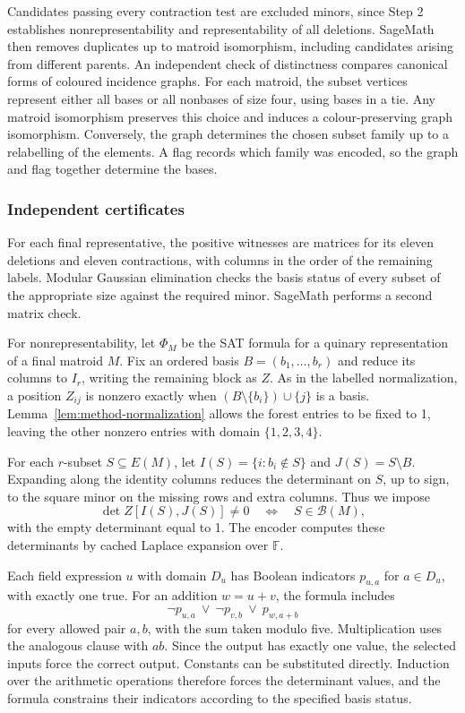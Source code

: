 \documentclass[11pt,letterpaper,titlepage]{article}
\def\F{\mathbb{F}}
\def\B{\mathcal{B}}
\begin{document}
Candidates passing every contraction test are excluded minors, since Step 2 establishes nonrepresentability and representability of all deletions. SageMath then removes duplicates up to matroid isomorphism, including candidates arising from different parents. An independent check of distinctness compares canonical forms of coloured incidence graphs. For each matroid, the subset vertices represent either all bases or all nonbases of size four, using bases in a tie. Any matroid isomorphism preserves this choice and induces a colour-preserving graph isomorphism. Conversely, the graph determines the chosen subset family up to a relabelling of the elements. A flag records which family was encoded, so the graph and flag together determine the bases.

\subsubsection{Independent certificates}

For each final representative, the positive witnesses are matrices for its eleven deletions and eleven contractions, with columns in the order of the remaining labels. Modular Gaussian elimination checks the basis status of every subset of the appropriate size against the required minor. SageMath performs a second matrix check.

For nonrepresentability, let \(\Phi_M\) be the SAT formula for a quinary representation of a final matroid \(M\). Fix an ordered basis \(B=(b_1,\ldots,b_r)\) and reduce its columns to \(I_r\), writing the remaining block as \(Z\). As in the labelled normalization, a position \(Z_{ij}\) is nonzero exactly when \((B\setminus\{b_i\})\cup\{j\}\) is a basis. Lemma~\ref{lem:method-normalization} allows the forest entries to be fixed to 1, leaving the other nonzero entries with domain \(\{1,2,3,4\}\).

For each \(r\)-subset \(S\subseteq E(M)\), let \(I(S)=\{i:b_i\notin S\}\) and \(J(S)=S\setminus B\). Expanding along the identity columns reduces the determinant on \(S\), up to sign, to the square minor on the missing rows and extra columns. Thus we impose
\[
 \det Z[I(S),J(S)]\ne 0
 \quad\Longleftrightarrow\quad S\in\B(M),
\]
with the empty determinant equal to 1. The encoder computes these determinants by cached Laplace expansion over \(\F\).

Each field expression \(u\) with domain \(D_u\) has Boolean indicators \(p_{u,a}\) for \(a\in D_u\), with exactly one true. For an addition \(w=u+v\), the formula includes
\[
 \neg p_{u,a}\ \lor\ \neg p_{v,b}\ \lor\ p_{w,a+b}
\]
for every allowed pair \(a,b\), with the sum taken modulo five. Multiplication uses the analogous clause with \(ab\). Since the output has exactly one value, the selected inputs force the correct output. Constants can be substituted directly. Induction over the arithmetic operations therefore forces the determinant values, and the formula constrains their indicators according to the specified basis status.
\end{document}
